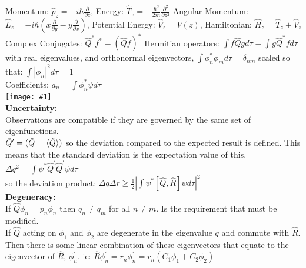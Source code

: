 \documentclass[10pt,landscape,a4paper]{article}
\newcommand{\inlineimage}[1]{\texttt{[image: \#1]}\\}
\newcommand{\minititle}[1]{\textbf{#1:}\\}
\renewcommand{\^}[1]{\ensuremath{\hat{#1}}}
\renewcommand{\-}[1]{\text{\sout{\ensuremath{#1}}}}
\begin{document}
\begin{multicols}{4}
	Momentum: $ \hat{p}_z = -i\hbar\frac{\partial}{\partial z} $, Energy: $ \hat{T}_z= -\frac{\hbar^2}{2m}\frac{\partial^2}{\partial z^2} $ Angular Momentum: $ \hat{L}_z = -i\hbar\left(x\frac{\partial}{\partial y}-y\frac{\partial}{\partial x}\right) $, Potential Energy: $ \hat{V}_z = V(z) $, Hamiltonian: $ \hat{H}_z = \hat{T}_z+\hat{V}_z $\\
	Complex Conjugates: $ \hat{Q}^*f^* = \left(\hat{Q}f\right)^* $ Hermitian operators: $ \int f\hat{Q}gd\tau = \int g\hat{Q}^*fd\tau $ with real eigenvalues, and orthonormal eigenvectors, $ 
	\int\phi^*_n\phi_md\tau = \delta_{nm} $ scaled so that: $ \int|\phi_n|^2d\tau = 1 $\\
	Coefficients: $ a_n = \int\phi^*_n\psi d\tau $\\
	\inlineimage{postulates.png}
	\textbf{Uncertainty:}\\
	Observations are compatible if they are governed by the same set of eigenfunctions.\\
	$ \hat{Q}^\prime = (\hat{Q} - \expval*{\hat{Q}}) $ so the deviation compared to the expected result is defined. This means that the standard deviation is the expectation value of this.
	$ \Delta q^2 = \int \psi^*\hat{Q}^\prime\hat{Q}^\prime\psi d\tau $\\
	so the deviation product: $ \Delta q\Delta r \ge \frac{1}{2}\left|\int\psi^*\left[\hat{Q},\hat{R}\right]\psi d \tau\right|^2 $\\
	\minititle{Degeneracy}
	If $ \hat{Q}\phi_n = p_n\phi_n $ then $ q_n\neq q_m $ for all $ n\neq m $. Is the requirement that must be modified.\\
	If $ \hat{Q} $ acting on $ \phi_1 $ and $ \phi_2 $ are degenerate in the eigenvalue $ q $ and commute with $ \hat{R} $. Then there is some linear combination of these eigenvectors that equate to the eigenvector of $ \hat{R} $, $ \phi^\prime_n $. ie: $ \hat{R}\phi^\prime_n = r_n\phi^\prime_n = r_n\left(C_1\phi_1+C_2\phi_2\right) $
	

\end{multicols}
\end{document}
